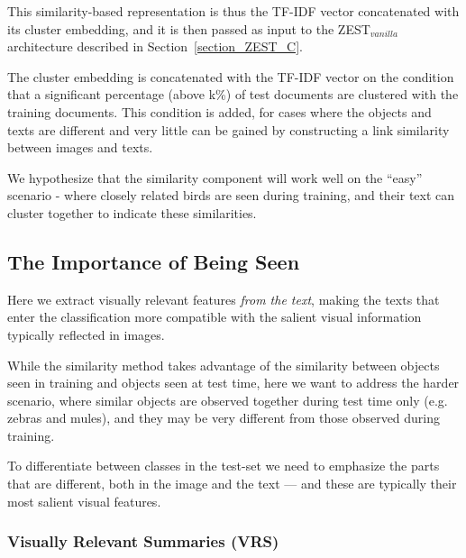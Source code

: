 \documentclass[11pt,a4paper]{article}
\newcommand\gal[1]{\textcolor{bright}{\textbf{GAL:} #1 }}
\begin{document}
This similarity-based representation is thus the TF-IDF vector concatenated with its cluster embedding, and it is then passed as input to the ZEST$_{vanilla}$ architecture described in Section~\ref{section_ZEST_C}.  \par

The cluster embedding is concatenated with the TF-IDF vector on the condition that a significant percentage (above k\%) of test documents are clustered with the training documents. This condition is added, for cases where the objects and texts are different and very little can be gained by constructing a link similarity between images and texts.
\par
We hypothesize that the similarity component will work well on the \enquote{easy} scenario - where closely related birds are seen during training,  and their text can cluster together to indicate these similarities.

\subsection{The Importance of Being Seen}

Here we extract visually relevant features \textit{from the text}, making the texts that enter the classification more compatible with the salient visual information typically reflected in images. 

While the similarity method takes advantage of the similarity between objects seen in training and objects seen at test time, here we want to address the harder scenario, where similar objects are observed together during test time only (e.g. zebras and mules), and they may be very different from those observed during training.  

To differentiate between  classes in the test-set we need to emphasize the parts that are  different, both in the image and the text --- and these are typically their most salient visual features. %

\subsubsection{Visually Relevant Summaries (VRS)}
\label{section:vrs_component}
\end{document}
